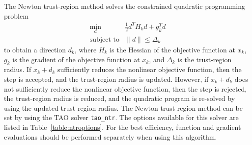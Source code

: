 The Newton trust-region method solves the constrained quadratic programming
problem
\[
\begin{array}{ll}
\min_d  & \frac{1}{2}d^T H_k d  + g_k^T d \\
\mbox{subject to} & \|d\| \leq \Delta_k
\end{array}
\]
to obtain a direction $d_k$, where $H_k$ is the Hessian of the objective 
function at $x_k$, $g_k$ is the gradient of the objective function at $x_k$, 
and $\Delta_k$ is the trust-region radius.  If $x_k + d_k$ sufficiently 
reduces the nonlinear objective function, then the step is accepted, and the 
trust-region radius is updated.  However, if $x_k + d_k$ does not
sufficiently
reduce the nonlinear objective function, then the step is rejected, the 
trust-region radius is reduced, and the quadratic program is re-solved 
by using the updated trust-region radius. The Newton trust-region method 
can be set by using the TAO solver {\tt tao\_ntr}. The options available 
for this solver are listed in Table~\ref{table:ntroptions}. For the best 
efficiency, 
function and gradient evaluations should be performed separately when 
using this algorithm.

